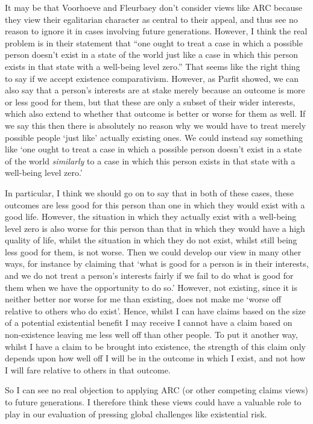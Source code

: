 \documentclass[man,11pt,a4paper]{apa7}
\begin{document}
It may be that Voorhoeve and Fleurbaey don't consider views like ARC because they view their egalitarian character as central to their appeal, and thus see no reason to ignore it in cases involving future generations. However, I think the real problem is in their statement that ``one ought to treat a case in which a possible person doesn't exist in a state of the world just like a case in which this person exists in that state with a well-being level zero.'' That seems like the right thing to say if we accept existence comparativism. However, as Parfit showed, we can also say that a person's interests are at stake merely because an outcome is more or less good for them, but that these are only a subset of their wider interests, which also extend to whether that outcome is better or worse for them as well. If we say this then there is absolutely no reason why we would have to treat merely possible people `just like' actually existing ones. We could instead say something like `one ought to treat a case in which a possible person doesn't exist in a state of the world \textit{similarly} to a case in which this person exists in that state with a well-being level zero.'

In particular, I think we should go on to say that in both of these cases, these outcomes are less good for this person than one in which they would exist with a good life. However, the situation in which they actually exist with a well-being level zero is also worse for this person than that in which they would have a high quality of life, whilst the situation in which they do not exist, whilst still being less good for them, is not worse. Then we could develop our view in many other ways, for instance by claiming that `what is good for a person is in their interests, and we do not treat a person's interests fairly if we fail to do what is good for them when we have the opportunity to do so.' However, not existing, since it is neither better nor worse for me than existing, does not make me `worse off relative to others who do exist'. Hence, whilst I can have claims based on the size of a potential existential benefit I may receive I cannot have a claim based on non-existence leaving me less well off than other people. To put it another way, whilst I have a claim to be brought into existence, the strength of this claim only depends upon how well off I will be in the outcome in which I exist, and not how I will fare relative to others in that outcome.

So I can see no real objection to applying ARC (or other competing claims views) to future generations. I therefore think these views could have a valuable role to play in our evaluation of pressing global challenges like existential risk.
\end{document}
